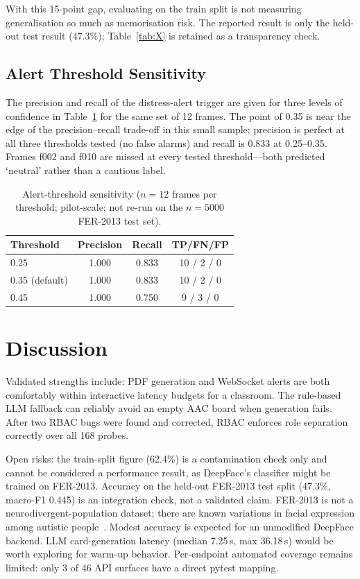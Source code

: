 \documentclass[conference]{IEEEtran}
\begin{document}
With this 15-point gap, evaluating on the train split is not measuring generalisation so much as memorisation risk. The reported result is only the held-out test result (47.3\%); Table~\ref{tab:X} is retained as a transparency check.

\subsection{Alert Threshold Sensitivity}
The precision and recall of the distress-alert trigger are given for three levels of confidence in Table~\ref{tab:XI} for the same set of 12 frames. The point of 0.35 is near the edge of the precision--recall trade-off in this small sample; precision is perfect at all three thresholds tested (no false alarms) and recall is 0.833 at 0.25--0.35. Frames f002 and f010 are missed at every tested threshold---both predicted `neutral' rather than a cautious label.

\begin{table}[!t]
\caption{Alert-threshold sensitivity ($n{=}12$ frames per threshold; pilot-scale; not re-run on the $n{=}5000$ FER-2013 test set).}
\label{tab:XI}
\centering
\small
\begin{tabular}{@{}lccc@{}}
\toprule
\textbf{Threshold} & \textbf{Precision} & \textbf{Recall} & \textbf{TP/FN/FP} \\
\midrule
0.25 & 1.000 & 0.833 & 10 / 2 / 0 \\
0.35 (default) & 1.000 & 0.833 & 10 / 2 / 0 \\
0.45 & 1.000 & 0.750 & 9 / 3 / 0 \\
\bottomrule
\end{tabular}
\end{table}

\section{Discussion}
Validated strengths include: PDF generation and WebSocket alerts are both comfortably within interactive latency budgets for a classroom. The rule-based LLM fallback can reliably avoid an empty AAC board when generation fails. After two RBAC bugs were found and corrected, RBAC enforces role separation correctly over all 168 probes.

Open risks: the train-split figure (62.4\%) is a contamination check only and cannot be considered a performance result, as DeepFace's classifier might be trained on FER-2013. Accuracy on the held-out FER-2013 test split (47.3\%, macro-F1 0.445) is an integration check, not a validated claim. FER-2013 is not a neurodivergent-population dataset; there are known variations in facial expression among autistic people~\cite{b9}. Modest accuracy is expected for an unmodified DeepFace backend. LLM card-generation latency (median 7.25\,s, max 36.18\,s) would be worth exploring for warm-up behavior. Per-endpoint automated coverage remains limited: only 3 of 46 API surfaces have a direct pytest mapping.
\end{document}
